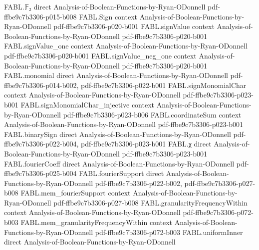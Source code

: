 \begin{theorem}
\label{FABL.exactlyThreePadClause_width_eq_three}
\leanok
{}
\proofstep
  {FABL.𝔽₂}
  {direct}
  {Analysis-of-Boolean-Functions-by-Ryan-ODonnell}
  {pdf-ffbe9c7b3306-p015-b008}
\proofstep
  {FABL.Sign}
  {context}
  {Analysis-of-Boolean-Functions-by-Ryan-ODonnell}
  {pdf-ffbe9c7b3306-p020-b001}
\proofstep
  {FABL.signValue}
  {context}
  {Analysis-of-Boolean-Functions-by-Ryan-ODonnell}
  {pdf-ffbe9c7b3306-p020-b001}
\proofstep
  {FABL.signValue_one}
  {context}
  {Analysis-of-Boolean-Functions-by-Ryan-ODonnell}
  {pdf-ffbe9c7b3306-p020-b001}
\proofstep
  {FABL.signValue_neg_one}
  {context}
  {Analysis-of-Boolean-Functions-by-Ryan-ODonnell}
  {pdf-ffbe9c7b3306-p020-b001}
\proofstep
  {FABL.monomial}
  {direct}
  {Analysis-of-Boolean-Functions-by-Ryan-ODonnell}
  {pdf-ffbe9c7b3306-p014-b002,
    pdf-ffbe9c7b3306-p022-b001}
\proofstep
  {FABL.signMonomialChar}
  {context}
  {Analysis-of-Boolean-Functions-by-Ryan-ODonnell}
  {pdf-ffbe9c7b3306-p023-b001}
\proofstep
  {FABL.signMonomialChar_injective}
  {context}
  {Analysis-of-Boolean-Functions-by-Ryan-ODonnell}
  {pdf-ffbe9c7b3306-p023-b006}
\proofstep
  {FABL.coordinateSum}
  {context}
  {Analysis-of-Boolean-Functions-by-Ryan-ODonnell}
  {pdf-ffbe9c7b3306-p023-b001}
\proofstep
  {FABL.binarySign}
  {direct}
  {Analysis-of-Boolean-Functions-by-Ryan-ODonnell}
  {pdf-ffbe9c7b3306-p022-b004,
    pdf-ffbe9c7b3306-p023-b001}
\proofstep
  {FABL.χ}
  {direct}
  {Analysis-of-Boolean-Functions-by-Ryan-ODonnell}
  {pdf-ffbe9c7b3306-p023-b001}
\proofstep
  {FABL.fourierCoeff}
  {direct}
  {Analysis-of-Boolean-Functions-by-Ryan-ODonnell}
  {pdf-ffbe9c7b3306-p025-b004}
\proofstep
  {FABL.fourierSupport}
  {direct}
  {Analysis-of-Boolean-Functions-by-Ryan-ODonnell}
  {pdf-ffbe9c7b3306-p022-b002,
    pdf-ffbe9c7b3306-p027-b008}
\proofstep
  {FABL.mem_fourierSupport}
  {context}
  {Analysis-of-Boolean-Functions-by-Ryan-ODonnell}
  {pdf-ffbe9c7b3306-p027-b008}
\proofstep
  {FABL.granularityFrequencyWithin}
  {context}
  {Analysis-of-Boolean-Functions-by-Ryan-ODonnell}
  {pdf-ffbe9c7b3306-p072-b003}
\proofstep
  {FABL.mem_granularityFrequencyWithin}
  {context}
  {Analysis-of-Boolean-Functions-by-Ryan-ODonnell}
  {pdf-ffbe9c7b3306-p072-b003}
\proofstep
  {FABL.uniformInner}
  {direct}
  {Analysis-of-Boolean-Functions-by-Ryan-ODonnell}

\end{theorem}
